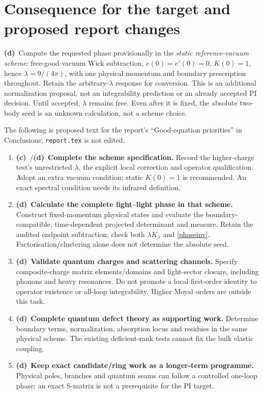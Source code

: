 \documentclass[11pt,a4paper]{article}
\newcommand{\C}{\textbf{(c)}\ }
\newcommand{\D}{\textbf{(d)}\ }
\newcommand{\file}[1]{\nolinkurl{#1}}
\begin{document}
\section{Consequence for the target and proposed report changes}
\D Compute the requested phase provisionally in the \emph{static
reference-vacuum scheme}: free-good-vacuum Wick subtraction,
$e(0)=e'(0)=0$, $K(0)=1$, hence $\lambda=9/(4\pi)$, with one physical
momentum and boundary prescription throughout. Retain the arbitrary-$\lambda$
response for conversion. This is an additional normalization proposal,
not an integrability prediction or an already accepted PI decision.
Until accepted, $\lambda$ remains free. Even after it is fixed, the
absolute two-body seed is an unknown calculation, not a scheme choice.

The following is proposed text for the report's ``Good-equation
priorities'' in Conclusions; \file{report.tex} is not edited.
\begin{enumerate}
\item \C/\D \textbf{Complete the scheme specification.} Record the
higher-charge test's unrestricted $\lambda$, the explicit local correction
and operator qualification. Adopt an extra vacuum condition; static
$K(0)=1$ is recommended. An exact spectral condition needs its infrared definition.
\item \D \textbf{Calculate the complete light--light phase in that scheme.}
Construct fixed-momentum physical states and evaluate the boundary-compatible,
time-dependent projected determinant and measure. Retain the audited
endpoint subtraction; check both $\lambda K_\lambda$ and \eqref{phaseinv}.
Factorisation/clustering alone does not determine the absolute seed.
\item \D \textbf{Validate quantum charges and scattering channels.}
Specify composite-charge matrix elements/domains and light-sector closure,
including phonons and heavy resonances. Do not promote a local first-order
identity to operator existence or all-loop integrability. Higher Moyal
orders are outside this task.
\item \D \textbf{Complete quantum defect theory as supporting work.}
Determine boundary terms, normalization, absorption locus and residues in
the same physical scheme. The existing deficient-rank tests cannot fix
the bulk elastic coupling.
\item \D \textbf{Keep exact candidate/ring work as a longer-term programme.}
Physical poles, branches and quantum seams can follow a controlled
one-loop phase; an exact S-matrix is not a prerequisite for the PI target.
\end{enumerate}
\end{document}
